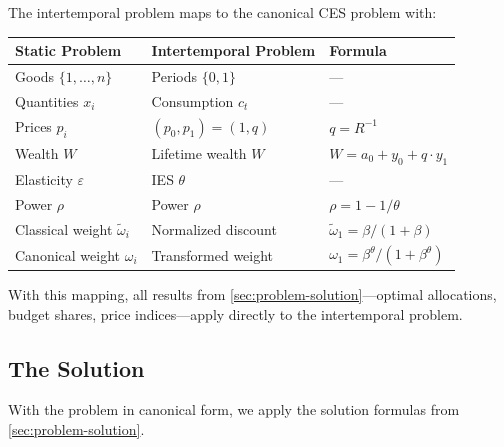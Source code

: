 \begin{calloutimportant}
The intertemporal problem maps to the canonical CES problem with:
\begin{center}
\renewcommand{\arraystretch}{1.4}
\begin{tabular}{@{}lll@{}}
\toprule
\textbf{Static Problem} & \textbf{Intertemporal Problem} & \textbf{Formula} \\
\midrule
Goods $\{1, \ldots, n\}$ & Periods $\{0, 1\}$ & --- \\
Quantities $x_i$ & Consumption $c_t$ & --- \\
Prices $p_i$ & $(p_0, p_1) = (1, q)$ & $q = R^{-1}$ \\
Wealth $W$ & Lifetime wealth $W$ & $W = a_0 + y_0 + q \cdot y_1$ \\
Elasticity $\varepsilon$ & IES $\theta$ & --- \\
Power $\rho$ & Power $\rho$ & $\rho = 1 - 1/\theta$ \\
Classical weight $\tilde{\omega}_i$ & Normalized discount & $\tilde{\omega}_1 = \beta/(1+\beta)$ \\
Canonical weight $\omega_i$ & Transformed weight & $\omega_1 = \beta^{\theta}/(1+\beta^{\theta})$ \\
\bottomrule
\end{tabular}
\end{center}
With this mapping, all results from \cref{sec:problem-solution}---optimal allocations, budget shares, price indices---apply directly to the intertemporal problem.
\end{calloutimportant}

\subsection{The Solution}
\label{subsec:two-period-solution}

With the problem in canonical form, we apply the solution formulas from \cref{sec:problem-solution}.

